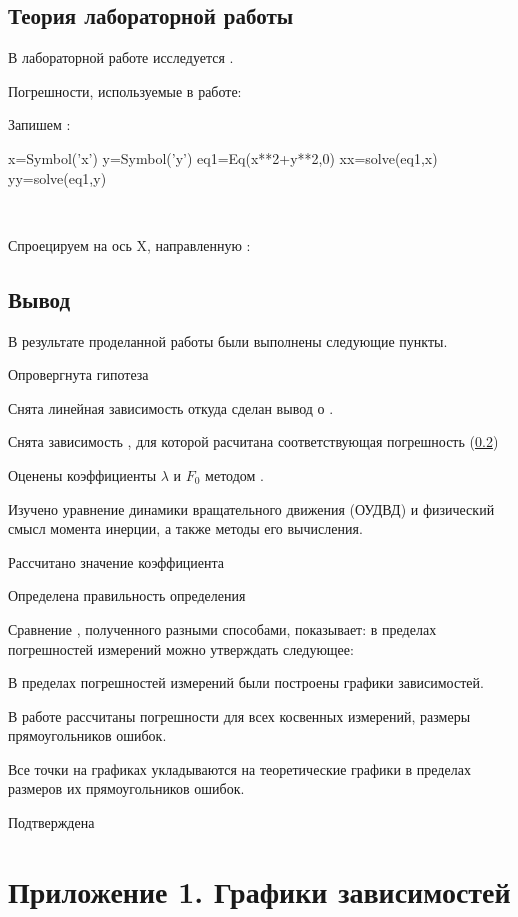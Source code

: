 % 
\subsection{Теория лабораторной работы}

В лабораторной работе исследуется .

Погрешности, используемые в работе: 

Запишем :
\begin{sympysilent}
	x=Symbol('x')
	y=Symbol('y')
	eq1=Eq(x**2+y**2,0)
	xx=solve(eq1,x)
	yy=solve(eq1,y)
\end{sympysilent}

\begin{EqSystem}
	\\
\end{EqSystem}

Спроецируем на ось X, направленную :
\begin{EqSystem}
	\label{eq:}
\end{EqSystem}

\subsection{Вывод}

В результате проделанной работы были выполнены следующие пункты.

Опровергнута гипотеза 

Снята линейная зависимость  откуда сделан вывод о .

Снята зависимость ,
для которой расчитана соответствующая погрешность (\ref{})

Оценены коэффициенты $\lambda$  и $F_0$ методом .

Изучено уравнение динамики вращательного движения (ОУДВД) и физический смысл момента инерции, а также методы его вычисления.

Рассчитано значение коэффициента 

Определена правильность определения

Сравнение , полученного разными способами, показывает: в пределах погрешностей измерений можно утверждать следующее: 


В пределах погрешностей измерений были построены графики зависимостей.

В работе рассчитаны погрешности для всех косвенных измерений, размеры прямоугольников ошибок. 

Все точки на графиках укладываются на  теоретические графики в пределах размеров их прямоугольников ошибок.

Подтверждена 

\newpage
\section*{Приложение 1. Графики зависимостей} %
\label{sec:figures}



